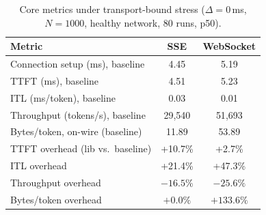 \documentclass[11pt]{article}
\begin{document}
\begin{table}[H]
\centering\small
\caption{Core metrics under transport-bound stress ($\Delta=0$\,ms, $N=1000$, healthy network, 80 runs, p50).}
\label{tab:stream-stress}
\begin{tabular}{@{}lcc@{}}
\toprule
Metric & SSE & WebSocket \\
\midrule
Connection setup (ms), baseline & 4.45 & 5.19 \\
TTFT (ms), baseline & 4.51 & 5.23 \\
ITL (ms/token), baseline & 0.03 & 0.01 \\
Throughput (tokens/s), baseline & 29{,}540 & 51{,}693 \\
Bytes/token, on-wire (baseline) & 11.89 & 53.89 \\
\midrule
TTFT overhead (lib vs.\ baseline) & +10.7\% & +2.7\% \\
ITL overhead & +21.4\% & +47.3\% \\
Throughput overhead & $-16.5\%$ & $-25.6\%$ \\
Bytes/token overhead & $+0.0\%$ & $+133.6\%$ \\
\bottomrule
\end{tabular}
\end{table}
\end{document}
